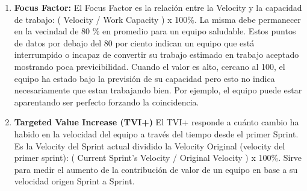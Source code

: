 \begin{enumerate}
{\begin{enumerate}
  \end{enumerate}

}

\item {\textbf{Focus Factor:} El Focus Factor es la relación entre la Velocity y la capacidad de trabajo: ( Velocity / Work Capacity ) x 100\%. La misma debe permanecer en la vecindad de 80 \% en promedio para un equipo saludable. Estos puntos de datos por debajo del 80 por ciento indican un equipo que está interrumpido o incapaz de convertir su trabajo estimado en trabajo aceptado mostrando poca previcibilidad. Cuando el valor es alto, cercano al 100, el equipo ha estado bajo la previsión de su capacidad pero esto no indica necesariamente que estan trabajando bien. Por ejemplo, el equipo puede estar aparentando ser perfecto forzando la coincidencia.}

\item {\textbf{Targeted Value Increase (TVI+)} El TVI+ responde a cuánto cambio ha habido en la velocidad del equipo a través del tiempo desde el primer Sprint. Es la Velocity del Sprint actual dividido la Velocity Original (velocity del primer sprint): ( Current Sprint’s Velocity / Original Velocity ) x 100\%. Sirve para medir el aumento de la contribución de valor de un equipo en base a su velocidad origen Sprint a Sprint.}


\end{enumerate}
